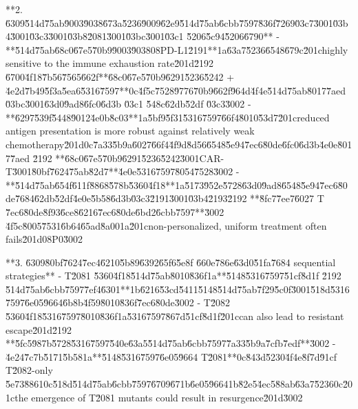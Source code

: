 \documentclass[10pt]{article}
\begin{document}
\begin{AnswerText}
**2. \u6309\u514d\u75ab\u9003\u9038\u673a\u5236\u9009\u62e9\u514d\u75ab\u6cbb\u7597\u836f\u7269\u03c7\u3001\u03b4\u3001\u03c3\u3001\u03b8\u2081\u3001\u03bc\u3001\u03c1 \u5206\u5c94\u5206\u6790**
- **\u514d\u75ab\u68c0\u67e5\u70b9\u9003\u9038\uff08PD-L1\u2191**\uff1a\u63a7\u5236\u6548\u679c\u201chighly sensitive to the immune exhaustion rate\u201d\u2192 \u6700\u4f18\u7b56\u7565\u662f**\u68c0\u67e5\u70b9\u6291\u5236\u5242 + \u4e2d\u7b49\u5f3a\u5ea6\u5316\u7597**\uff0c\u4f5c\u7528\u9776\u70b9\u662f\u964d\u4f4e\u514d\u75ab\u8017\u7aed \u03bc\u3001\u63d0\u9ad8\u6fc0\u6d3b \u03c1 \u548c\u62db\u52df \u03c3\u3002
- **\u6297\u539f\u5448\u9012\u4e0b\u8c03**\uff1a\u5bf9\u5f31\u5316\u7597\u66f4\u8010\u53d7\u201creduced antigen presentation is more robust against relatively weak chemotherapy\u201d\uff0c\u7a33\u5b9a\u6027\u66f4\u4f9d\u8d56\u6548\u5e94\u7ec6\u80de\u6fc0\u6d3b\u4e0e\u8017\u7aed \u2192 **\u68c0\u67e5\u70b9\u6291\u5236\u5242\u3001CAR-T\u3001\u80bf\u7624\u75ab\u82d7**\u4e0e\u5316\u7597\u8054\u7528\u3002
- **\u514d\u75ab\u654f\u611f\u8868\u578b\u5360\u4f18**\uff1a\u5173\u952e\u5728\u63d0\u9ad8\u6548\u5e94\u7ec6\u80de\u7684\u62db\u52df\u4e0e\u5b58\u6d3b\u03c3\u2191\u3001\u03b4\u2193\u2192 **\u8fc7\u7ee7\u6027 T \u7ec6\u80de\u8f93\u6ce8\u6216\u7ec6\u80de\u6bd2\u6cbb\u7597**\u3002
\u4f5c\u8005\u7531\u6b64\u65ad\u8a00\uff1a\u201cnon-personalized, uniform treatment often fails\u201d\uff08P0\u3002

**3. \u6309\u80bf\u7624\u7ec4\u6210\u5b89\u6392\u65f6\u5e8f \u660e\u786e\u63d0\u51fa\u7684 sequential strategies**
- T\u2081 \u5360\u4f18\u514d\u75ab\u8010\u836f\uff1a**\u5148\u5316\u7597\u51cf\u8d1f \u2192 \u514d\u75ab\u6cbb\u7597\u7ef4\u6301**\uff1b\u6216\u53cd\u5411\u5148\u514d\u75ab\u7f29\u5c0f\u3001\u518d\u5316\u7597\u6e05\u9664\u6b8b\u4f59\u8010\u836f\u7ec6\u80de\u3002
- T\u2082 \u5360\u4f18\u5316\u7597\u8010\u836f\uff1a\u5316\u7597\u867d\u51cf\u8d1f\u201ccan also lead to resistant escape\u201d\u2192 **\u5fc5\u987b\u5728\u5316\u7597\u540e\u63a5\u514d\u75ab\u6cbb\u7597\u7a33\u5b9a\u7cfb\u7edf**\u3002
- \u4e24\u7c7b\u5171\u5b58\uff1a**\u5148\u5316\u7597\u6e05\u9664 T\u2081**\uff0c\u843d\u5230\u4f4e\u8f7d\u91cf T\u2082-only \u5e73\u8861\uff0c\u518d\u514d\u75ab\u6cbb\u7597\u6709\u671b\u6e05\u9664\uff1b\u82e5\u4ec5\u88ab\u63a7\u5236\uff0c\u201cthe emergence of T\u2081 mutants could result in resurgence\u201d\u3002


\end{AnswerText}
\end{document}
